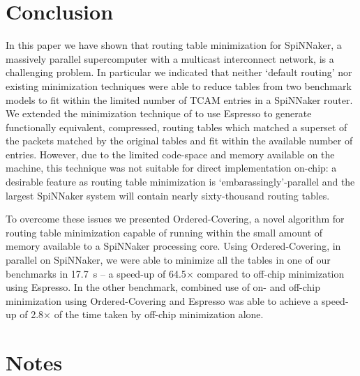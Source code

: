 \documentclass[conference]{IEEEtran}
\begin{document}
    

  \section{Conclusion}

  In this paper we have shown that routing table minimization for SpiNNaker, a massively parallel supercomputer with a multicast interconnect network, is a challenging problem.
  In particular we indicated that neither `default routing' nor existing minimization techniques were able to reduce tables from two benchmark models to fit within the limited number of TCAM entries in a SpiNNaker router.
  We extended the minimization technique of \textcite{Liu2002} to use Espresso to generate functionally equivalent, compressed, routing tables which matched a superset of the packets matched by the original tables and fit within the available number of entries.
  However, due to the limited code-space and memory available on the machine, this technique was not suitable for direct implementation on-chip: a desirable feature as routing table minimization is `embarassingly'-parallel and the largest SpiNNaker system will contain nearly sixty-thousand routing tables.

  To overcome these issues we presented Ordered-Covering, a novel algorithm for routing table minimization capable of running within the small amount of memory available to a SpiNNaker processing core.
  Using Ordered-Covering, in parallel on SpiNNaker, we were able to minimize all the tables in one of our benchmarks in \SI{17.7}{\second} -- a speed-up of 64.5$\times$ compared to off-chip minimization using Espresso.
  In the other benchmark, combined use of on- and off-chip minimization using Ordered-Covering and Espresso was able to achieve a speed-up of 2.8$\times$ of the time taken by off-chip minimization alone.

\section*{Notes}
\end{document}
